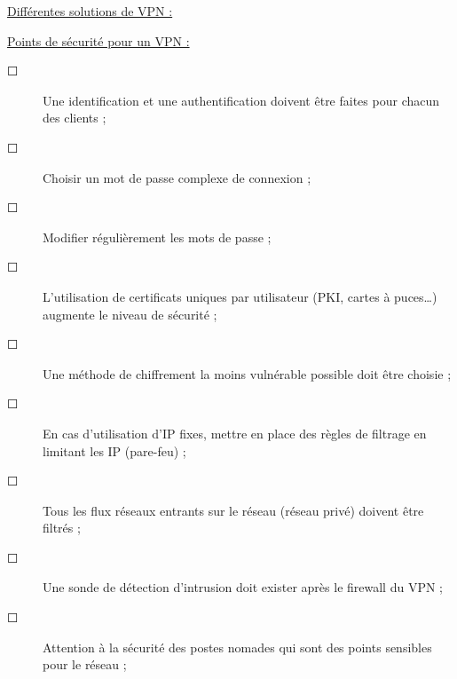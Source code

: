 \documentclass[a4paper,11pt]{article}				    %
\begin{document}
{
\underline{Diff\'erentes solutions de VPN :}

\underline{Points de s\'ecurit\'e pour un VPN :}
\begin{description}
	\item[$\Square$] Une identification et une authentification doivent \^etre faites pour chacun des clients ;
	\item[$\Square$] Choisir un mot de passe complexe de connexion ;
	\item[$\Square$] Modifier r\'eguli\`erement les mots de passe ;
	\item[$\Square$] L'utilisation de certificats uniques par utilisateur (PKI, cartes \`a puces\dots{}) augmente le niveau de s\'ecurit\'e ;
	\item[$\Square$] Une m\'ethode de chiffrement la moins vuln\'erable possible doit \^etre choisie ;
	\item[$\Square$] En cas d'utilisation d'IP fixes, mettre en place des r\`egles de filtrage en limitant les IP (pare-feu) ;
	\item[$\Square$] Tous les flux r\'eseaux entrants sur le r\'eseau (r\'eseau priv\'e) doivent \^etre filtr\'es ;
	\item[$\Square$] Une sonde de d\'etection d'intrusion doit exister apr\`es le firewall du VPN ;
	\item[$\Square$] Attention \`a la s\'ecurit\'e des postes nomades qui sont des points sensibles pour le r\'eseau ;
\end{description}
}
\end{document}
